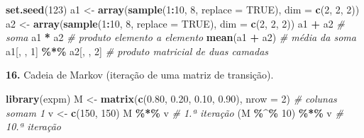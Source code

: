\documentclass[
  portuguese,
  11pt,
  openany]{book}
\newenvironment{Shaded}{\begin{snugshade}}{\end{snugshade}}
\newcommand{\AttributeTok}[1]{\textcolor[rgb]{0.13,0.29,0.53}{#1}}
\newcommand{\CommentTok}[1]{\textcolor[rgb]{0.56,0.35,0.01}{\textit{#1}}}
\newcommand{\ConstantTok}[1]{\textcolor[rgb]{0.56,0.35,0.01}{#1}}
\newcommand{\DecValTok}[1]{\textcolor[rgb]{0.00,0.00,0.81}{#1}}
\newcommand{\FloatTok}[1]{\textcolor[rgb]{0.00,0.00,0.81}{#1}}
\newcommand{\FunctionTok}[1]{\textcolor[rgb]{0.13,0.29,0.53}{\textbf{#1}}}
\newcommand{\NormalTok}[1]{#1}
\newcommand{\OtherTok}[1]{\textcolor[rgb]{0.56,0.35,0.01}{#1}}
\newcommand{\SpecialCharTok}[1]{\textcolor[rgb]{0.81,0.36,0.00}{\textbf{#1}}}
\begin{document}
\begin{Shaded}
\begin{Highlighting}[]
\FunctionTok{set.seed}\NormalTok{(}\DecValTok{123}\NormalTok{)}
\NormalTok{a1 }\OtherTok{\textless{}{-}} \FunctionTok{array}\NormalTok{(}\FunctionTok{sample}\NormalTok{(}\DecValTok{1}\SpecialCharTok{:}\DecValTok{10}\NormalTok{, }\DecValTok{8}\NormalTok{, }\AttributeTok{replace =} \ConstantTok{TRUE}\NormalTok{), }\AttributeTok{dim =} \FunctionTok{c}\NormalTok{(}\DecValTok{2}\NormalTok{, }\DecValTok{2}\NormalTok{, }\DecValTok{2}\NormalTok{))}
\NormalTok{a2 }\OtherTok{\textless{}{-}} \FunctionTok{array}\NormalTok{(}\FunctionTok{sample}\NormalTok{(}\DecValTok{1}\SpecialCharTok{:}\DecValTok{10}\NormalTok{, }\DecValTok{8}\NormalTok{, }\AttributeTok{replace =} \ConstantTok{TRUE}\NormalTok{), }\AttributeTok{dim =} \FunctionTok{c}\NormalTok{(}\DecValTok{2}\NormalTok{, }\DecValTok{2}\NormalTok{, }\DecValTok{2}\NormalTok{))}
\NormalTok{a1 }\SpecialCharTok{+}\NormalTok{ a2                     }\CommentTok{\# soma}
\NormalTok{a1 }\SpecialCharTok{*}\NormalTok{ a2                     }\CommentTok{\# produto elemento a elemento}
\FunctionTok{mean}\NormalTok{(a1 }\SpecialCharTok{+}\NormalTok{ a2)               }\CommentTok{\# média da soma}
\NormalTok{a1[, , }\DecValTok{1}\NormalTok{] }\SpecialCharTok{\%*\%}\NormalTok{ a2[, , }\DecValTok{2}\NormalTok{]     }\CommentTok{\# produto matricial de duas camadas}
\end{Highlighting}
\end{Shaded}

\textbf{16.} Cadeia de Markov (iteração de uma matriz de transição).

\begin{Shaded}
\begin{Highlighting}[]
\FunctionTok{library}\NormalTok{(expm)}
\NormalTok{M }\OtherTok{\textless{}{-}} \FunctionTok{matrix}\NormalTok{(}\FunctionTok{c}\NormalTok{(}\FloatTok{0.80}\NormalTok{, }\FloatTok{0.20}\NormalTok{, }\FloatTok{0.10}\NormalTok{, }\FloatTok{0.90}\NormalTok{), }\AttributeTok{nrow =} \DecValTok{2}\NormalTok{)  }\CommentTok{\# colunas somam 1}
\NormalTok{v }\OtherTok{\textless{}{-}} \FunctionTok{c}\NormalTok{(}\DecValTok{150}\NormalTok{, }\DecValTok{150}\NormalTok{)}
\NormalTok{M }\SpecialCharTok{\%*\%}\NormalTok{ v            }\CommentTok{\# 1.ª iteração}
\NormalTok{(M }\SpecialCharTok{\%\^{}\%} \DecValTok{10}\NormalTok{) }\SpecialCharTok{\%*\%}\NormalTok{ v   }\CommentTok{\# 10.ª iteração}
\end{Highlighting}
\end{Shaded}
\end{document}
